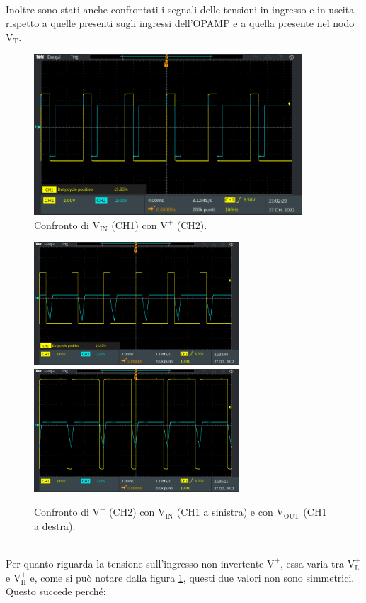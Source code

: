 \documentclass{report}
\begin{document}
\\Inoltre sono stati anche confrontati i segnali delle tensioni in ingresso e in uscita rispetto a quelle presenti sugli ingressi dell'OPAMP e a quella presente nel nodo $\mathrm{V_T}$.
\begin{figure}[h]
	\centering
	\includegraphics[height=6cm]{immagini/TEK00003}
	\caption{Confronto di $\mathrm{V_{IN}}$ (CH1) con $\mathrm{V^+}$ (CH2).}
	\label{figura:TEK00003}
\end{figure}
\begin{figure}[h]
	\centering
	\includegraphics[height=4.6cm]{immagini/TEK00004}
	\includegraphics[height=4.6cm]{immagini/TEK00005}
	\caption{Confronto di $\mathrm{V^-}$ (CH2) con $\mathrm{V_{IN}}$ (CH1 a sinistra) e con $\mathrm{V_{OUT}}$ (CH1 a destra).}
	\label{figura:TEK00004e5}
\end{figure}
\\Per quanto riguarda la tensione sull'ingresso non invertente $\mathrm{V^+}$, essa varia tra $\mathrm{V_L^+}$ e $\mathrm{V_H^+}$ e, come si può notare dalla figura \ref{figura:TEK00003}, questi due valori non sono simmetrici. Questo succede perché:
\end{document}
